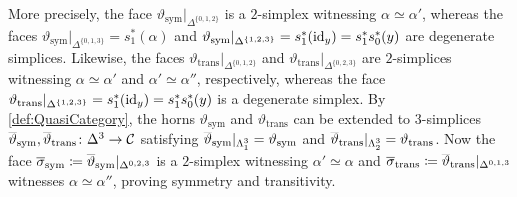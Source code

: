 \begin{numpar}[Compositions.]
	More precisely, the face $\vartheta_\mathrm{sym}|_{\Delta^{\{0,1,2\}}}$ is a $2$-simplex witnessing $\alpha\simeq \alpha'$, whereas the faces $\vartheta_\mathrm{sym}|_{\Delta^{\{0,1,3\}}}=s_1^*(\alpha)$ and $\vartheta_\mathrm{sym}|_{\Delta^{\{1,2,3\}}}=s_1^*(\operatorname{id}_y)=s_1^*s_0^*(y)$ are degenerate simplices. Likewise, the faces $\vartheta_\mathrm{trans}|_{\Delta^{\{0,1,2\}}}$ and $\vartheta_\mathrm{trans}|_{\Delta^{\{0,2,3\}}}$ are $2$-simplices witnessing $\alpha\simeq \alpha'$ and $\alpha'\simeq \alpha''$, respectively, whereas the face $\vartheta_\mathrm{trans}|_{\Delta^{\{1,2,3\}}}=s_1^*(\operatorname{id}_y)=s_1^*s_0^*(y)$ is a degenerate simplex. By \cref{def:QuasiCategory}, the horns $\vartheta_\mathrm{sym}$ and $\vartheta_\mathrm{trans}$ can be extended to $3$-simplices $\ov\vartheta_\mathrm{sym},\ov\vartheta_\mathrm{trans}\colon \Delta^3\rightarrow \Cc$ satisfying $\ov\vartheta_\mathrm{sym}|_{\Lambda_1^3}=\vartheta_\mathrm{sym}$ and $\ov\vartheta_\mathrm{trans}|_{\Lambda_2^3}=\vartheta_\mathrm{trans}$. Now the face $\ov\sigma_\mathrm{sym}\coloneqq \ov\vartheta_\mathrm{sym}|_{\Delta^{0,2,3}}$ is a $2$-simplex witnessing $\alpha'\simeq \alpha$ and $\ov\sigma_\mathrm{trans}\coloneqq \ov\vartheta_\mathrm{trans}|_{\Delta^{0,1,3}}$ witnesses $\alpha\simeq \alpha''$, proving symmetry and transitivity.
	

\end{numpar}
